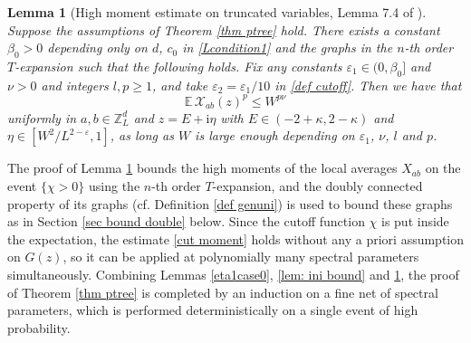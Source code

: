 \documentclass{article}
\newcommand{\1}{\mathds{1}}
\numberwithin{equation}{section}
\newcommand{\be}{\begin{equation}}
\newcommand{\ee}{\end{equation}}
\newcommand{\e}{{\varepsilon}}
\renewcommand{\cal}{\mathcal}
\newcommand{\ii}{\mathrm{i}} %
\renewcommand{\leq}{\leqslant}
\renewcommand{\geq}{\geqslant}
\renewcommand{\le}{\leq}
\renewcommand{\ge}{\geq}
\newcommand{\E}{\mathbb{E}}
\newcommand{\Z}{\mathbb{Z}}
\theoremstyle{plain} %
\newtheorem{lemma}[theorem]{Lemma}
\theoremstyle{remark}
\newcommand{\cob}{\color{purple}}
\begin{document}
\begin{lemma}[High moment estimate on truncated variables, Lemma 7.4 of \cite{PartII_high}]\label{lemma ptree}  %
Suppose the assumptions of Theorem \ref{thm ptree} hold. There exists a constant $\beta_0>0$ depending only on $d$, $c_0$ in \eqref{Lcondition1} and the graphs in the $n$-th order $T$-expansion such that the following holds. Fix any constants $\e_1\in (0,\beta_0]$ and $\nu>0$ and integers $l,p\ge 1$, and take $\e_2=\e_1/10$ in \eqref{def cutoff}. Then we have that
\be\label{cut moment}
\E\, \cal X_{ab}(z)^p\le W^{p\nu}
\ee
uniformly in $a,b\in \Z_L^d$ and $z=E+\ii\eta$ with $E\in (-2+\kappa,2-\kappa)$ and $\eta\in [W^{2}/L^{2-\e},1]$, as long as $W$ is large enough depending on $\e_1$, $\nu$, $l$ and $p$.
\end{lemma}

The proof of Lemma \ref{lemma ptree} bounds the high moments of the local averages $X_{ab}$ on the event $\{\chi>0\}$ using the $n$-th order $T$-expansion, and the doubly connected property of its graphs (cf. Definition \ref{def genuni}) is used to bound these graphs as in Section \ref{sec bound double} below. Since the cutoff function $\chi$ is put inside the expectation, the estimate \eqref{cut moment} holds without any a priori assumption on $G(z)$, so it can be applied at polynomially many spectral parameters simultaneously. Combining Lemmas \ref{eta1case0}, \ref{lem: ini bound} and \ref{lemma ptree}, the proof of Theorem \ref{thm ptree} is completed by an induction on a fine net of spectral parameters, which is performed deterministically on a single event of high probability.
 
 
 
\end{document}
